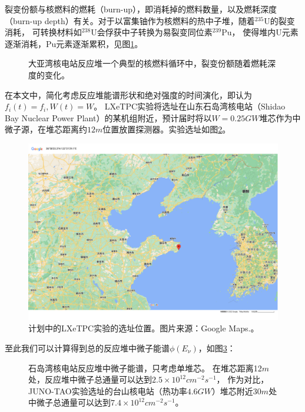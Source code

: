 裂变份额与核燃料的燃耗（burn-up），即消耗掉的燃料数量，以及燃耗深度（burn-up depth）有关。对于以富集铀作为核燃料的热中子堆，随着${}^{235}\mathrm{U}$的裂变消耗，
可转换材料如${}^{238}\mathrm{U}$会俘获中子转换为易裂变同位素${}^{239}\mathrm{Pu}$，
使得堆内$\mathrm{U}$元素逐渐消耗，$\mathrm{Pu}$元素逐渐累积，见图\ref{fig:fission_fraction}。

\begin{figure}
    \centering
    
    \caption{\label{fig:fission_fraction} 大亚湾核电站反应堆一个典型的核燃料循环中，裂变份额随着燃耗深度的变化\cite{an_evolution_2017}。}
\end{figure}

在本文中，简化考虑反应堆能谱形状和绝对强度的时间演化，即认为$f_i(t)=f_i,W(t)=W$。
LXeTPC实验将选址在山东石岛湾核电站（Shidao Bay Nuclear Power Plant）的某机组附近，预计届时将以$W=0.25\si{GW}$堆芯作为中微子源，在堆芯距离约$12\si{m}$位置放置探测器。实验选址如图\ref{fig:shidaowan}。

\begin{figure}
    \centering
    \includegraphics[width=1.0\linewidth]{figures/shidaowan.pdf}
    \caption{\label{fig:shidaowan} 计划中的LXeTPC实验的选址位置。图片来源：Google Maps.\cite{shidaowan_googlemap_220524}。}
\end{figure}

至此我们可以计算得到总的反应堆中微子能谱$\phi\left(E_\nu\right)$，如图\ref{fig:neutrino_flux_spectrum}：

\begin{figure}
    \centering
    
    \caption{\label{fig:neutrino_flux_spectrum} 石岛湾核电站反应堆中微子能谱，只考虑单堆芯。
    在堆芯距离12$\si{m}$处，反应堆中微子总通量可以达到$2.5\times 10^{12}\si{cm^{-2}s^{-1}}$，
    作为对比，JUNO-TAO实验选址的台山核电站（热功率$4.6\si{GW}$）堆芯附近$30\si{m}$处中微子总通量可以达到$7.4\times 10^{12}\si{cm^{-2}s^{-1}}$\cite{juno_collaboration_tao_2020}。}
\end{figure}

